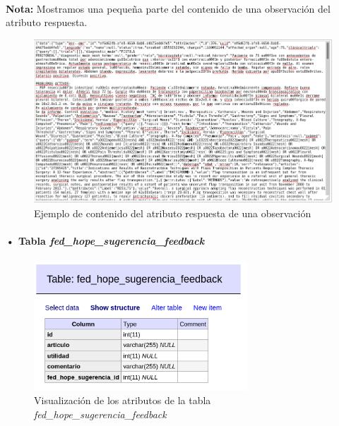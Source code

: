\documentclass[10pt,a4paper,oneside]{book}
\begin{document}
\paragraph{}
\textbf{Nota:} Mostramos una pequeña parte del contenido de una observación del atributo respuesta.
\begin{figure}[!htb]
  \centering
  \includegraphics[width=15cm]{images/metodologia_tabla_fed_hope_sugerencia_attribute_respuesta.png}
  \caption{Ejemplo de contenido del atributo respuesta de una observación}
\end{figure}

\newpage
\paragraph{• Tabla \textit{fed\_hope\_sugerencia\_feedback}}

\paragraph{}
\begin{figure}[!htb]
  \centering
  \includegraphics[width=8cm]{images/metodologia_tabla_fed_hope_sugerencia_feedback.png}
  \caption{Visualización de los atributos de la tabla \textit{fed\_hope\_sugerencia\_feedback}}
\end{figure}
\end{document}
